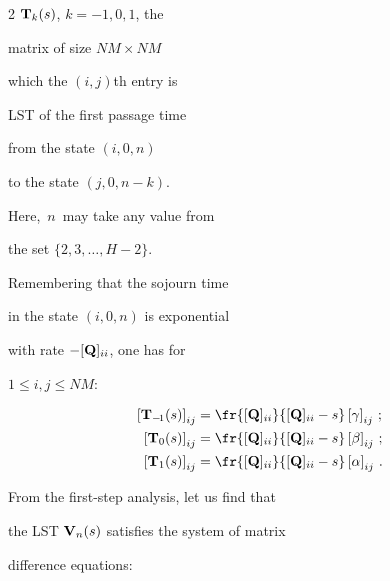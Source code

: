 \begin{multicols}{2}
$\mathbf{T}_k(s)$, $k=-1,0,1$, the 


matrix of size $NM \times NM$ 


which the $(i,j)${th} entry is 


LST of the first passage time


from the state $(i,0,n)$ 


to the state $(j,0,n-k)$.


Here,~$n$~may take any value from 


the set $\{2,3,\dots,H-2\}$. 


Remembering that the sojourn time 


in the state $(i,0,n)$ is exponential 


with rate $-[\mathbf{Q}]_{ii}$, one has for 


$1 \le i,j \le NM$:


\begin{align*}


\left[ \bmx{T}_{-\!1}(s) \right]_{ij}


&=


\fr{[\bmx{Q}]_{ii} }{[\bmx{Q}]_{ii} - s}


\left[\gamma\right]_{ij}  \,;


\\


\left[ \bmx{T}_0(s) \right]_{ij}


&=


\fr{[\bmx{Q}]_{ii}}{[\bmx{Q}]_{ii} - s}


\left[\beta\right]_{ij}  \,;


\\


\left[ \bmx{T}_1(s) \right]_{ij}


&=


\fr{[\bmx{Q}]_{ii} }{[\bmx{Q}]_{ii} - s}


\left[\alpha\right]_{ij} \,.


\end{align*}





\noindent 


From the first-step analysis, let us find that


the LST $\mathbf{V}_n(s)$ satisfies the system of matrix 


difference equations: 


\begin{equation}


\left.



\end{equation}
\end{multicols}
